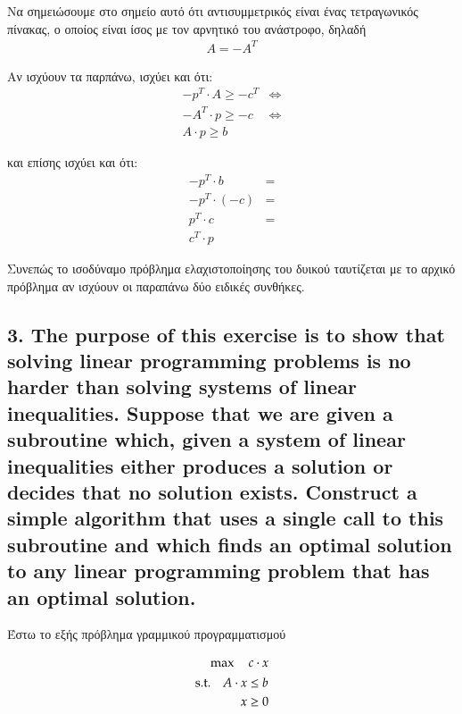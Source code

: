 \documentclass[12pt]{article}
\begin{document}
Να σημειώσουμε στο σημείο αυτό ότι αντισυμμετρικός είναι ένας τετραγωνικός πίνακας, ο οποίος είναι ίσος με τον αρνητικό του ανάστροφο, δηλαδή  \\

\begin{align*}
	A = -A^{T}
\end{align*}

Αν ισχύουν τα παρπάνω, ισχύει και ότι: \\

\begin{align*}
	-p^{T} \cdot A \geq -c^{T} &\Leftrightarrow \\
	-A^{T} \cdot p \geq -c &\Leftrightarrow \\
	A \cdot p \geq b
\end{align*}

και επίσης ισχύει και ότι: \\

\begin{align*}
	-p^{T} \cdot b &= \\ 
	-p^{T} \cdot \left( - c \right) &= \\
	p^{T} \cdot c &= \\
	c^{T} \cdot p
\end{align*}


Συνεπώς το ισοδύναμο πρόβλημα ελαχιστοποίησης του δυικού ταυτίζεται με το αρχικό πρόβλημα αν ισχύουν οι παραπάνω δύο ειδικές συνθήκες.

\vspace{2in}

\pagebreak

\subsection*{3. The purpose of this exercise is to show that solving linear programming
problems is no harder than solving systems of linear inequalities. Suppose that we are given
a subroutine which, given a system of linear inequalities either produces a solution or decides
that no solution exists. Construct a simple algorithm that uses a single call to this subroutine
and which finds an optimal solution to any linear programming problem that has an optimal
solution.}

Έστω το εξής πρόβλημα γραμμικού προγραμματισμού

\begin{align*}
    \max \quad c \cdot x \\
    \begin{aligned}
   		\textup{s.t.}\quad
    	  A \cdot  x & \leq b \\
	      x & \geq 0
    \end{aligned}
\end{align*}
\end{document}
